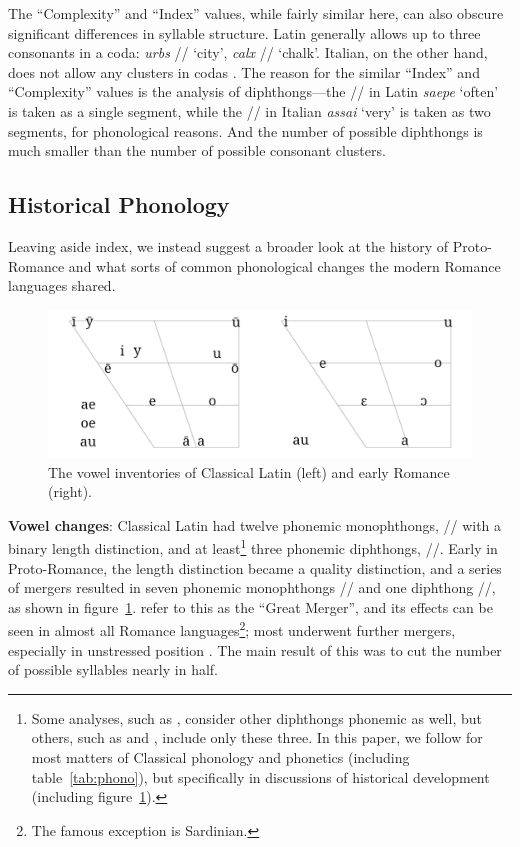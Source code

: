 \documentclass[12pt,twoside]{article}
\newcommand{\ipa}[1]{/\textipa{#1}/}
\begin{document}
The ``Complexity'' and ``Index'' values, while fairly similar here, can also obscure significant differences in syllable structure. Latin generally allows up to three consonants in a coda: \emph{urbs} \ipa{urps} `city', \emph{calx} \ipa{kalks} `chalk'. Italian, on the other hand, does not allow any clusters in codas \citep{hall}. The reason for the similar ``Index'' and ``Complexity'' values is the analysis of diphthongs---the \ipa{a\textsubarch{e}} in Latin \emph{saepe} `often' is taken as a single segment, while the \ipa{a\textsubarch{i}} in Italian \emph{assai} `very' is taken as two segments, for phonological reasons. And the number of possible diphthongs is much smaller than the number of possible consonant clusters.

\subsection{Historical Phonology}

Leaving aside  index, we instead suggest a broader look at the history of Proto-Romance and what sorts of common phonological changes the modern Romance languages shared.

\begin{figure}[h]
\centering
\caption{The vowel inventories of Classical Latin (left) and early Romance (right).}
\label{fig:vowels}
\noindent\includegraphics[width=\linewidth]{vowelchange}
\end{figure}

\textbf{Vowel changes}: Classical Latin had twelve phonemic monophthongs, \ipa{i y e a o u} with a binary length distinction, and at least\footnote{Some analyses, such as \citet{allen}, consider other diphthongs phonemic as well, but others, such as \citet{alkire} and \citet{boyd}, include only these three. In this paper, we follow \citeauthor{allen} for most matters of Classical phonology and phonetics (including table~\ref{tab:phono}), but \citet{alkire} specifically in discussions of historical development (including figure~\ref{fig:vowels}).} three phonemic diphthongs, \ipa{a\textsubarch{e} o\textsubarch{e} a\textsubarch{u}}. Early in Proto-Romance, the length distinction became a quality distinction, and a series of mergers resulted in seven phonemic monophthongs \ipa{i e E a O o u} and one diphthong \ipa{a\textsubarch{u}}, as shown in figure~\ref{fig:vowels}. \citet{alkire} refer to this as the ``Great Merger'', and its effects can be seen in almost all Romance languages\footnote{The famous exception is Sardinian.}; most underwent further mergers, especially in unstressed position \citep{alkire,boyd}. The main result of this was to cut the number of possible syllables nearly in half.
\end{document}
